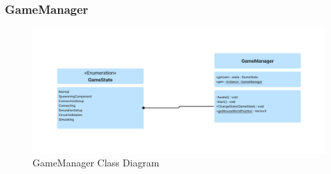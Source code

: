 \documentclass[../main.tex]{subfiles}
\begin{document}
\subsubsection{GameManager}\begin{figure}[h!]
\centering
\includegraphics[scale=0.2]{images/chapter3/Class3.png}
\caption{GameManager Class Diagram}
\label{GameManager }
\end{figure}
\vfill
\newpage
\end{document}
